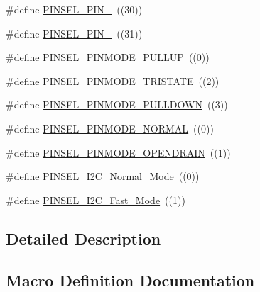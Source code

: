\begin{DoxyCompactItemize}
\item 
\#define \hyperlink{group___p_i_n_s_e_l___public___macros_ga8b7430cef75c76e4824a34093cb037c6}{P\+I\+N\+S\+E\+L\+\_\+\+P\+I\+N\+\_}~((30))
\item 
\#define \hyperlink{group___p_i_n_s_e_l___public___macros_ga07d3d7517dd2653ef8d0644a353f1101}{P\+I\+N\+S\+E\+L\+\_\+\+P\+I\+N\+\_}~((31))
\item 
\#define \hyperlink{group___p_i_n_s_e_l___public___macros_ga2a9e1ebf0d763e08959c69866272532e}{P\+I\+N\+S\+E\+L\+\_\+\+P\+I\+N\+M\+O\+D\+E\+\_\+\+P\+U\+L\+L\+UP}~((0))
\item 
\#define \hyperlink{group___p_i_n_s_e_l___public___macros_ga6777cc9af3537a1a29dd1a577993851f}{P\+I\+N\+S\+E\+L\+\_\+\+P\+I\+N\+M\+O\+D\+E\+\_\+\+T\+R\+I\+S\+T\+A\+TE}~((2))
\item 
\#define \hyperlink{group___p_i_n_s_e_l___public___macros_ga5d6ee82664e7bf5c016f748f05931061}{P\+I\+N\+S\+E\+L\+\_\+\+P\+I\+N\+M\+O\+D\+E\+\_\+\+P\+U\+L\+L\+D\+O\+WN}~((3))
\item 
\#define \hyperlink{group___p_i_n_s_e_l___public___macros_ga699b7086c454cbc6e279f7f7c7d25ee6}{P\+I\+N\+S\+E\+L\+\_\+\+P\+I\+N\+M\+O\+D\+E\+\_\+\+N\+O\+R\+M\+AL}~((0))
\item 
\#define \hyperlink{group___p_i_n_s_e_l___public___macros_ga11e5a84a23abfca37227c8b40f3f4161}{P\+I\+N\+S\+E\+L\+\_\+\+P\+I\+N\+M\+O\+D\+E\+\_\+\+O\+P\+E\+N\+D\+R\+A\+IN}~((1))
\item 
\#define \hyperlink{group___p_i_n_s_e_l___public___macros_ga9275d5f93ab8a39abbcc7a63f91c72d0}{P\+I\+N\+S\+E\+L\+\_\+\+I2\+C\+\_\+\+Normal\+\_\+\+Mode}~((0))
\item 
\#define \hyperlink{group___p_i_n_s_e_l___public___macros_ga741f812cde543d91c6c887518656a7aa}{P\+I\+N\+S\+E\+L\+\_\+\+I2\+C\+\_\+\+Fast\+\_\+\+Mode}~((1))
\end{DoxyCompactItemize}


\subsection{Detailed Description}


\subsection{Macro Definition Documentation}
